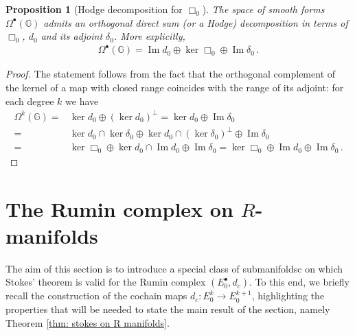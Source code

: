 \documentclass[dvipsnames]{amsart}
\newtheorem{proposition}[theorem]{Proposition}
\theoremstyle{definition}
\theoremstyle{definition}
\numberwithin{equation}{section}
\newcommand{\G}{\mathbb{G}}
\begin{document}
\begin{proposition}[Hodge decomposition for $\Box_0$]\label{prop: Hodge decomposition for Box0}
    The space of smooth forms $\Omega^\bullet(\G)$ admits an orthogonal direct sum (or a Hodge) decomposition in terms of $\Box_0$, $d_0$ and its adjoint $\delta_0$. More explicitly,
    \begin{align}\label{eq: hodge decompo Box_0}
        \Omega^\bullet(\G)=\operatorname{Im}d_0\oplus\ker\Box_0\oplus\operatorname{Im}\delta_0\,.
    \end{align}
\end{proposition}
\begin{proof}
    The statement follows from the fact that the orthogonal complement of the kernel of a map with closed range coincides with the range of its adjoint: for each degree $k$ we have
    \begin{align*}
        \Omega^k(\G)=&\ker d_0\oplus\left(\ker d_0\right)^\perp=\ker d_0\oplus\operatorname{Im}\delta_0\\=&\ker d_0\cap\ker\delta_0\oplus\ker d_0\cap\left(\ker\delta_0\right)^\perp\oplus\operatorname{Im}\delta_0\\=&\ker\Box_0\oplus\ker d_0\cap\operatorname{Im}d_0\oplus\operatorname{Im}\delta_0=\ker\Box_0\oplus\operatorname{Im}d_0\oplus\operatorname{Im}\delta_0\,.
    \end{align*}
\end{proof}
\section{The Rumin complex on $R$-manifolds}
The aim of this section is to introduce a special class of submanifoldsc on which Stokes' theorem is valid for the Rumin complex $(E_0^\bullet,d_c)$. To this end, we briefly recall the construction of the cochain maps $d_c\colon E_0^k\to E_0^{k+1}$, highlighting the properties that will be needed to state the main result of the section, namely Theorem \ref{thm: stokes on R manifolds}.
\end{document}
